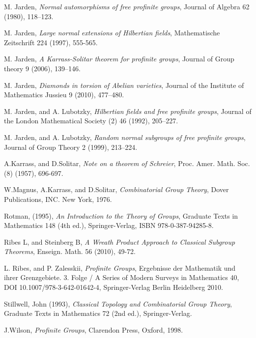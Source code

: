 \documentclass[12pt,a4paper]{article}
\begin{document}
\begin{thebibliography}{60}
 M. Jarden, \emph{Normal automorphisms of free profinite groups}, Journal of Algebra 62 (1980), 118--123.

 M. Jarden, \emph{Large normal extensions of Hilbertian fields}, Mathematische Zeitschrift 224 (1997), 555-565.

 M. Jarden, \emph{A Karrass-Solitar theorem for profinite groups}, Journal of Group theory 9 (2006), 139--146.

 M. Jarden, \emph{Diamonds in torsion of Abelian varieties}, Journal of the Institute of Mathematics Jussieu 9 (2010), 477--480.  
 
 M. Jarden, and A. Lubotzky, \emph{Hilbertian fields and free profinite groups}, Journal of the London Mathematical Society (2) 46 (1992), 205--227.

 M. Jarden, and A. Lubotzky, \emph{Random normal subgroups of free profinite groups}, Journal of Group Theory 2 (1999), 213--224.

 A.Karrass, and D.Solitar, \emph{Note on a theorem of Schreier}, Proc. Amer. Math. Soc. (8) (1957), 696-697.

 W.Magnus, A.Karrass, and D.Solitar, \emph{Combinatorial Group Theory}, Dover Publications, INC. New York, 1976.

 Rotman, (1995), \emph{An Introduction to the Theory of Groups}, Graduate Texts in Mathematics 148 (4th ed.), Springer-Verlag, ISBN 978-0-387-94285-8.

 Ribes L, and Steinberg B, \emph{A Wreath Product Approach to Classical Subgroup Theorems}, Enseign. Math. 56 (2010), 49-72.

 L. Ribes, and P. Zalesskii, \emph{Profinite Groups}, Ergebnisse der Mathematik und ihrer Grenzgebiete. 3. Folge / A Series of Modern Surveys in Mathematics 40, DOI 10.1007/978-3-642-01642-4, \textcopyright \space Springer-Verlag Berlin Heidelberg 2010.

 Stillwell, John (1993), \emph{Classical Topology and Combinatorial Group Theory}, Graduate Texts in Mathematics 72 (2nd ed.), Springer-Verlag.

 J.Wilson, \emph{Profinite Groups}, Clarendon Press, Oxford, 1998.

\end{thebibliography}
\end{document}
